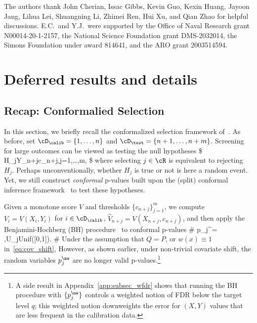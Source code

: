 The authors thank John Cherian, Issac Gibbs, Kevin Guo, Kexin Huang,
Jayoon Jang, Lihua Lei, Shuangning Li, Zhimei Ren,
Hui Xu, and Qian Zhao for helpful discussions.
E.C.~and Y.J.~were supported by the Office of Naval Research grant N00014-20-1-2157, the National Science
Foundation grant DMS-2032014, the Simons Foundation under award 814641, and the ARO grant
2003514594.


% 


\appendix
\section{Deferred results and details}

\subsection{Recap: Conformalied Selection}
\label{app:recap_unweighted}

In this section, we briefly recall the conformalized selection framework of~\cite{jin2022selection}.
As before, set $\cD_\calib=\{1,\dots,n\}$
and $\cD_\test=\{n+1,\dots,n+m\}$.
Screening for large outcomes can be viewed as testing the null hypotheses
\$
H_j\colon Y_{n+j}\leq c_{n+j},\quad  j=1,\dots,m,
\$
where selecting $j\in \cR$ is equivalent to rejecting $H_j$.
Perhaps unconventionally, whether $H_j$ is true or not
is here a random event. Yet,  we
still construct \emph{conformal} p-values built upon the (split) conformal inference
framework~\cite{vovk2005algorithmic} to test these hypotheses.


Given a monotone score  $V$ and thresholds $\{c_{n+j}\}_{j=1}^m$,
we compute
$V_i = V(X_i,Y_i)$ for $i\in \cD_\calib$,
$\hat{V}_{n+j}=V(X_{n+j},c_{n+j})$,
and then apply the Benjamini-Hochberg (BH) procedure~\cite{benjamini1995controlling} to
%
conformal p-values
\#\label{eq:conformal_pval}
p_j^\nw = ,\quad U_j\iid \textrm{Unif}([0,1]).
\#
Under the assumption that $Q=P$, or $w(x)\equiv 1$ in~\eqref{eq:cov_shift},
%
However, as shown earlier,
under non-trivial covariate shift, the random variables $p_j^\nw$
are no longer valid p-values.\footnote{
A side result in Appendix~\ref{app:subsec_wfdr} shows that
running the BH procedure with $\{p_j^\nw\}$
controls a weighted notion of FDR below the target level $q$;
this weighted notion downweights the error for $(X,Y)$ values
that are less frequent in the calibration data.}


